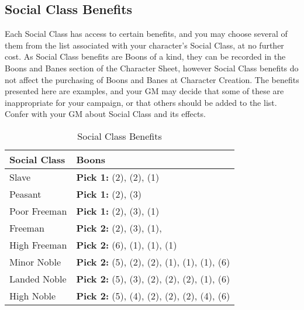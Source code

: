 \documentclass[oneside,11pt,english]{book}
\begin{document}
\subsection{Social Class Benefits} Each Social Class has access to certain benefits, and you may choose several of them from the list associated with your character’s Social Class, at no further cost. As Social Class benefits are Boons of a kind, they can be recorded in the Boons and Banes section of the Character Sheet, however Social Class benefits do not affect the purchasing of Boons and Banes at Character Creation.
The benefits presented here are examples, and your GM may decide that some of these are inappropriate for your campaign, or that others should be added to the list. Confer with your GM about Social Class and its effects.

\begin{table}
	\centering
	\caption{Social Class Benefits}
	\label{
		Social Class Benefits}
	\begin{tabu} spread 0pt{X[-1]X}
Social Class	&Boons\\\toprule
Slave			&\textbf{Pick 1:}  (2),  (2),  (1)\\
Peasant			&\textbf{Pick 1:}  (2),  (3)\\
Poor Freeman	&\textbf{Pick 1:}  (2),  (3),  (1)\\
Freeman			&\textbf{Pick 2:}  (2),  (3),  (1),\\
High Freeman	&\textbf{Pick 2:}  (6),  (1),  (1),  (1)\\
Minor Noble		&\textbf{Pick 2:}  (5),  (2),  (2),  (1),  (1),  (1),  (6)\\
Landed Noble	&\textbf{Pick 2:}  (5),  (3),  (2),  (2),  (2),  (1),  (6)\\
High Noble		&\textbf{Pick 2:}  (5),  (4),  (2),  (2),  (2),  (4),  (6)\\

\end{tabu}
\end{table}
\end{document}
